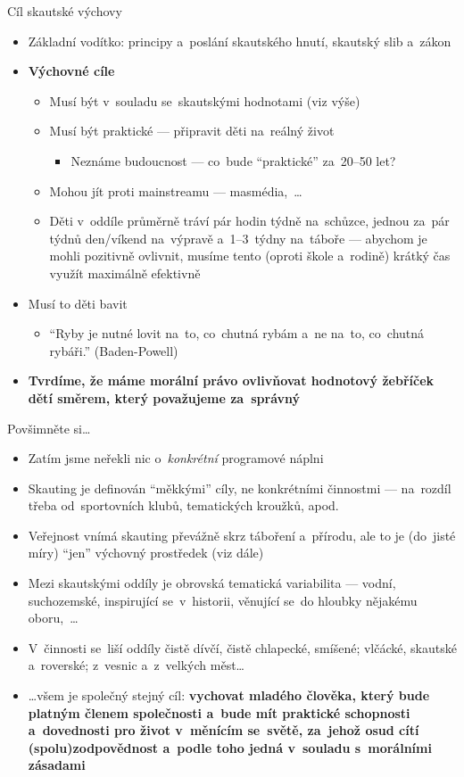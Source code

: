 \documentclass[compress, xelatex, 11pt, xcolor=dvipsnames, print, aspectratio=169,
	hyperref={
		bookmarks=true,
		unicode=true,
		colorlinks=true,
		pdftitle={Skautska vychovna metoda},
		plainpages=false,
		pdfauthor={Vojtech Zeisek},
		pdfsubject={Skautska vychovna metoda a jeji vyvoj za posledni stoleti a desetileti},
		pdfcreator={XeLaTeX},
		pdfkeywords={Junak, Pedagogika, Skaut, Skauting, Vychovna metoda},
		linkcolor=Red, %
		anchorcolor=ForestGreen, %
		citecolor=ForestGreen, %
		filecolor=ForestGreen, %
		menucolor=ForestGreen, %
		urlcolor=Sepia, %
		pdftex},
	url={hyphens, lowtilde} %
	]{beamer}
\begin{document}
\begin{frame}{Cíl skautské výchovy}
	\begin{itemize}
		\item Základní vodítko: principy a~poslání skautského hnutí, skautský slib a~zákon
		\item \textbf{Výchovné cíle}
		\begin{itemize}
			\item Musí být v~souladu se~skautskými hodnotami (viz výše)
			\item Musí být praktické --- připravit děti na~reálný život
			\begin{itemize}
		\item Neznáme budoucnost --- co~bude \enquote{praktické} za~20--50 let?
			\end{itemize}
			\item Mohou jít proti mainstreamu --- masmédia,~\ldots
			\item Děti v~oddíle průměrně tráví pár hodin týdně na~schůzce, jednou za~pár týdnů den/víkend na~výpravě a~1--3~týdny na~táboře --- abychom je mohli pozitivně ovlivnit, musíme tento (oproti škole a~rodině) krátký čas využít maximálně efektivně
		\end{itemize}
		\item Musí to děti bavit
			\begin{itemize}
		\item \enquote{Ryby je nutné lovit na~to, co~chutná rybám a~ne na~to, co~chutná rybáři.} (Baden-Powell)
			\end{itemize}
		\item \textbf{Tvrdíme, že máme morální právo ovlivňovat hodnotový žebříček dětí směrem, který považujeme za~správný}
	\end{itemize}
\end{frame}

\begin{frame}{Povšimněte si\ldots}
	\begin{itemize}
		\item Zatím jsme neřekli nic o~\textit{konkrétní} programové náplni
		\item Skauting je definován \enquote{měkkými} cíly, ne konkrétními činnostmi --- na~rozdíl třeba od~sportovních klubů, tematických kroužků, apod.
		\item Veřejnost vnímá skauting převážně skrz táboření a~přírodu, ale to je (do~jisté míry) \enquote{jen} výchovný prostředek (viz dále)
		\item Mezi skautskými oddíly je obrovská tematická variabilita --- vodní, suchozemské, inspirující se~v~historii, věnující se~do hloubky nějakému oboru,~\ldots
		\item V~činnosti se~liší oddíly čistě dívčí, čistě chlapecké, smíšené; vlčácké, skautské a~roverské; z~vesnic a~z~velkých měst\ldots
		\item \ldots všem je společný stejný \alert{cíl}: \textbf{vychovat mladého člověka, který bude platným členem společnosti a~bude mít praktické schopnosti a~dovednosti pro život v~měnícím se~světě, za~jehož osud cítí (spolu)zodpovědnost a~podle toho jedná v~souladu s~morálními zásadami}
	\end{itemize}
\end{frame}
\end{document}

